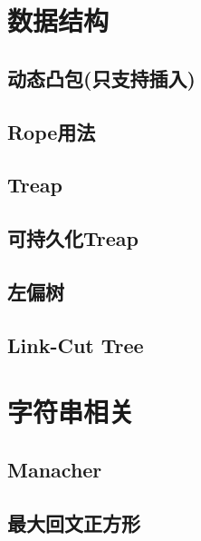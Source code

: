 \documentclass[landscape, twocolumn, 8pt, a4paper, twoside]{extarticle}
\begin{document}
\begin{spacing}{0.1}
\section{数据结构}
\subsection{动态凸包(只支持插入)}


\subsection{Rope用法}


\subsection{Treap}


\subsection{可持久化Treap}


\subsection{左偏树}


\subsection{Link-Cut Tree}


\section{字符串相关}
\subsection{Manacher}


\subsection{最大回文正方形}



\end{spacing}
\end{document}
